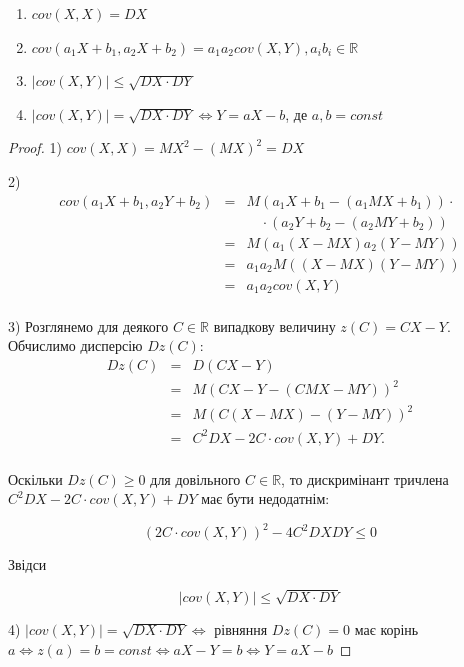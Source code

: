 \begin{theorem}
    \begin{enumerate}
        \item $cov(X, X) = DX$
        \item $cov(a_1 X + b_1, a_2 X + b_2) = a_1 a_2 cov(X, Y), a_i b_i \in \mathbb{R}$
        \item $|cov(X, Y)| \leqslant \sqrt{DX \cdot DY}$
        \item $|cov(X, Y)| = \sqrt{DX \cdot DY} \Leftrightarrow Y = aX - b$,
            де $a, b = const$
    \end{enumerate}
\end{theorem}
\begin{proof}
    1) $cov(X, X) = MX^2 - (MX)^2 = DX$

    2)
    $$\begin{array}{rcl}
        cov(a_1 X + b_1, a_2 Y + b_2) & = & M(a_1 X + b_1 - (a_1 MX + b_1)) \cdot \\
        &   & \quad \cdot (a_2 Y + b_2 - (a_2 MY + b_2)) \\
        & = & M(a_1 (X - MX) a_2 (Y - MY)) \\
        & = & a_1 a_2 M((X - MX) (Y - MY)) \\
        & = & a_1 a_2 cov(X, Y) \\
    \end{array}$$

    3) Розглянемо для деякого $C \in \mathbb{R}$ випадкову
    величину $z(C) = CX - Y$.
    Обчислимо дисперсію $Dz(C)$:
    $$\begin{array}{rcl}
        Dz(C) & = & D(CX - Y) \\
        & = & M(CX - Y - (CMX - MY))^2 \\
        & = & M(C(X - MX) - (Y - MY))^2 \\
        & = & C^2 DX - 2 C \cdot cov(X, Y) + DY. \\
    \end{array}$$
    
    Оскільки $Dz(C) \geqslant 0$ для довільного $C \in \mathbb{R}$,
    то дискримінант тричлена $C^2 DX - 2 C \cdot cov(X, Y) + DY$
    має бути недодатнім:
    
    $$(2 C \cdot cov(X, Y))^2 - 4C^2 DX DY \leqslant 0$$
    
    Звідси
    
    $$|cov(X, Y)| \leqslant \sqrt{DX \cdot DY}$$

    4) $|cov(X, Y)| = \sqrt{DX \cdot DY} \Leftrightarrow$
    рівняння $Dz(C) = 0$ має корінь
    $a \Leftrightarrow z(a) = b = const
    \Leftrightarrow a X - Y = b 
    \Leftrightarrow Y = a X - b$ 
\end{proof}

